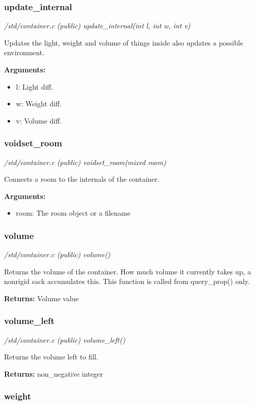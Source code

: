 \subsubsection{update\_internal}

{\em /std/container.c (public) update\_internal(int l, int w, int v)}

Updates the light, weight and volume of things inside
also updates a possible environment.

{\bf Arguments:}
\begin{itemize}
\item      l: Light diff.
\item w: Weight diff.
\item v: Volume diff.
\end{itemize}


\subsubsection{voidset\_room}

{\em /std/container.c (public) voidset\_room(mixed room)}

Connects a room to the internals of the container.

{\bf Arguments:}
\begin{itemize}
\item     room: The room object or a filename
\end{itemize}


\subsubsection{volume}

{\em /std/container.c (public) volume()}

Returns the volume of the container. How much volume it
currently takes up, a nonrigid sack accumulates this.
This function is called from query\_prop() only.

{\bf Returns:}    Volume value


\subsubsection{volume\_left}

{\em /std/container.c (public) volume\_left()}

Returns the volume left to fill.

{\bf Returns:}    non\_negative integer


\subsubsection{weight}

